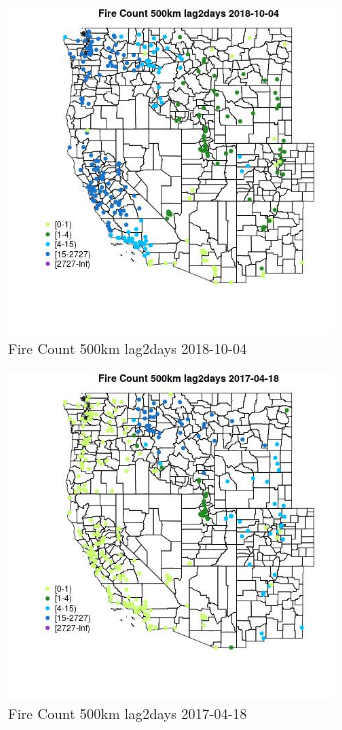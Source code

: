 \begin{figure} 
\centering  
\includegraphics[width=0.77\textwidth]{Code_Outputs/Report_ML_input_PM25_Step4_part_f_de_duplicated_aves_prioritize_24hr_obswNAs_MapObsFire_Count_500km_lag2days2018-10-04.jpg} 
\caption{\label{fig:Report_ML_input_PM25_Step4_part_f_de_duplicated_aves_prioritize_24hr_obswNAsMapObsFire_Count_500km_lag2days2018-10-04}Fire Count 500km lag2days 2018-10-04} 
\end{figure} 
 

\begin{figure} 
\centering  
\includegraphics[width=0.77\textwidth]{Code_Outputs/Report_ML_input_PM25_Step4_part_f_de_duplicated_aves_prioritize_24hr_obswNAs_MapObsFire_Count_500km_lag2days2017-04-18.jpg} 
\caption{\label{fig:Report_ML_input_PM25_Step4_part_f_de_duplicated_aves_prioritize_24hr_obswNAsMapObsFire_Count_500km_lag2days2017-04-18}Fire Count 500km lag2days 2017-04-18} 
\end{figure} 
 

